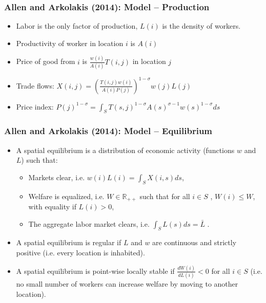 \documentclass[10pt,notes=hide]{beamer}
\begin{document}
\begin{frame}
\frametitle{Allen and Arkolakis (2014): Model -- Production}
\begin{itemize}
\item Labor is the only factor of production, $L(i)$  is the density of workers.
\item Productivity of worker in location $i$ is $A(i)$
\item Price of good from $i$ is $\frac{w\left(i\right)}{A\left(i\right)}T\left(i,j\right)$  in location $j$
\item Trade flows: $X(i,j) = \left (\frac{T(i,j)w(i)}{A(i)P(j)}\right)^{1-\sigma} w(j)L(j)$
\item Price index: $P(j)^{1-\sigma} = \int_{S}  T(s,j)^{1-\sigma} A(s)^{\sigma-1} w(s)^{1-\sigma} ds$
\end{itemize}
\end{frame}
\begin{frame}
\frametitle{Allen and Arkolakis (2014): Model -- Equilibrium}
\begin{itemize}
\item A spatial equilibrium is a distribution of economic activity (functions $w$ and $L$) such that:
\begin{itemize}
\item Markets clear, i.e. $w\left(i\right)L\left(i\right)=\int_{S}X\left(i,s\right)ds$, 
\item Welfare is equalized, i.e. $W\in\mathbb{R}_{++}$  such that for all $ i\in S$ , $W\left(i\right)\leq W$, with equality if $L\left(i\right)>0$, 
\item The aggregate labor market clears, i.e. $\int_{S}L\left(s\right)ds=\bar{L}$ . 
\end{itemize}
\medskip
\item A spatial equilibrium is regular if $L$ and $w$ are continuous and strictly positive (i.e. every location is inhabited).\medskip
\item A spatial equilibrium is point-wise locally stable if $\frac{dW\left(i\right)}{dL\left(i\right)}<0$ for all $  i\in S$ (i.e. no small number of workers can increase welfare by moving to another location).
 
\end{itemize}
\end{frame}
\end{document}
